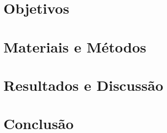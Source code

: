 \documentclass[
	12pt,				%
	openright,			%
	oneside,			%
	a4paper,			%
	english,			%
	french,				%
	spanish,			%
	brazil				%
	]{abntex2}
\begin{document}
\part*{Objetivos}

\part*{Materiais e Métodos}

\part*{Resultados e Discussão}

\part*{Conclusão}



\postextual



%
%








\printindex
\end{document}
